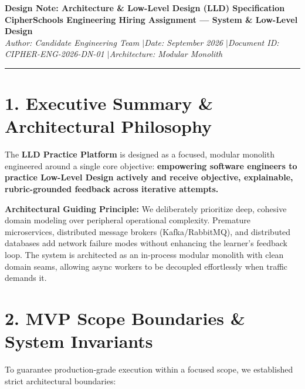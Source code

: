 \documentclass[10pt,a4paper]{article}
\begin{document}
{\LARGE \textbf{\color{primary}Design Note: Architecture \& Low-Level Design (LLD) Specification}}\\[0.2em]
\textbf{CipherSchools Engineering Hiring Assignment --- System \& Low-Level Design}\\
\textit{Author: Candidate Engineering Team \quad$\vert$\quad Date: September 2026 \quad$\vert$\quad Document ID: CIPHER-ENG-2026-DN-01 \quad$\vert$\quad Architecture: Modular Monolith}
\vspace{-0.4em}\rule{\textwidth}{1.2pt}\vspace{-0.2em}

\section{1. Executive Summary \& Architectural Philosophy}

The \textbf{LLD Practice Platform} is designed as a focused, modular monolith engineered around a single core objective: \textbf{empowering software engineers to practice Low-Level Design actively and receive objective, explainable, rubric-grounded feedback across iterative attempts.}

\begin{tcolorbox}
\textbf{Architectural Guiding Principle:} We deliberately prioritize deep, cohesive domain modeling over peripheral operational complexity. Premature microservices, distributed message brokers (Kafka/RabbitMQ), and distributed databases add network failure modes without enhancing the learner's feedback loop. The system is architected as an in-process modular monolith with clean domain seams, allowing async workers to be decoupled effortlessly when traffic demands it.
\end{tcolorbox}

\section{2. MVP Scope Boundaries \& System Invariants}

To guarantee production-grade execution within a focused scope, we established strict architectural boundaries:
\end{document}
